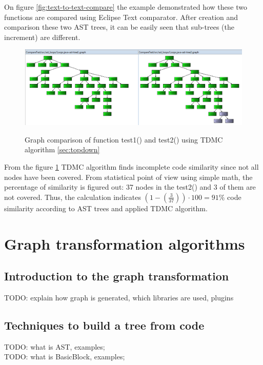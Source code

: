 \documentclass{report}
\begin{document}
On figure \ref{fig:text-to-text-compare} the example demonstrated how these two functions are compared using Eclipse Text comparator. After creation and comparison these two AST trees, it can be easily seen that sub-trees (the increment) are different.

\begin{figure}[hb]
  \centering
  \includegraphics[width=1.00\textwidth]{Figures/AST-optimization/tree-compared1}\\[0.1cm]
  \caption[Graph comparison on similar AST trees]{Graph comparison of function test1() and test2() using TDMC algorithm \ref{sec:topdown}}
  \label{fig:ast-graph-compare-similar-tdmc}
\end{figure}


From the figure \ref{fig:ast-graph-compare-similar-tdmc} TDMC algorithm finds incomplete code similarity since not all nodes have been covered. From statistical point of view using simple math, the percentage of similarity is figured out: 37 nodes in the test2() and 3 of them are not covered. Thus, the calculation indicates  $\left ( 1 - \left (\frac{3}{37}\right )  \right )\cdot 100 = 91\%$ code similarity according to AST trees and applied TDMC algorithm.



\chapter{Graph transformation algorithms}
\label{cha:Algorithms2}

\section{Introduction to the graph transformation}

TODO: explain how graph is generated, which libraries are used, plugins

\section{Techniques to build a tree from code}
TODO: what is AST, examples;
\\
TODO: what is BasicBlock, examples;
\end{document}
